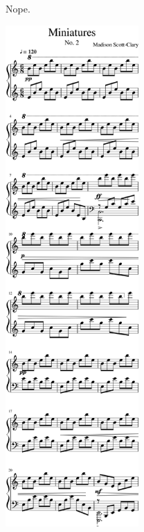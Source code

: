 \begin{paracol}{2}
\begin{leftcolumn}
\begin{ally}
Nope.
\end{ally}
\newpage
\end{leftcolumn}
\begin{rightcolumn*}
  \begin{flushright}
\noindent\includegraphics[width=2in]{assets/static/miniatures/2-1.png}
\end{flushright}


\end{rightcolumn*}
\end{paracol}

